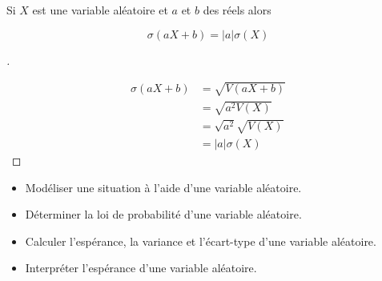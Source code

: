 \documentclass[12pt]{article}
\theoremstyle{break}
\newenvironment{demo}[1][\proofname]{%
  \begin{proof}[#1]$ $\newline
  }{%
  \end{proof}
}
\begin{document}
\begin{proposition}{}{}
  Si $X$ est une variable aléatoire et $a$ et $b$ des réels alors

  $$
  \sigma(a X+b)=|a| \sigma(X)
  $$
\end{proposition}

\begin{demo}
  $$
  \begin{aligned}
    \sigma(a X+b) & =\sqrt{V(a X+b)} \\
    & =\sqrt{a^{2} V(X)} \\
    & =\sqrt{a^{2}} \sqrt{V(X)} \\
    & =|a| \sigma(X)
  \end{aligned}
  $$
\end{demo}

\begin{savoir}{}{}
  \begin{itemize}
    \item Modéliser une situation à l'aide d'une variable aléatoire.
    \item Déterminer la loi de probabilité d'une variable aléatoire.
    \item Calculer l'espérance, la variance et l'écart-type d'une variable aléatoire.
    \item Interpréter l'espérance d'une variable aléatoire.
  \end{itemize}
\end{savoir}
\end{document}
